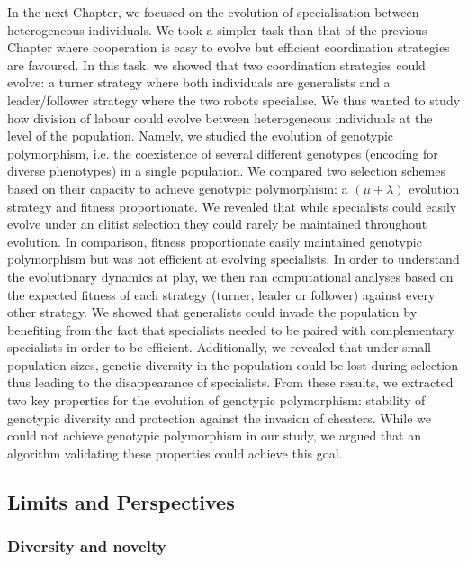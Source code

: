		In the next Chapter, we focused on the evolution of specialisation between heterogeneous individuals. We took a simpler task than that of the previous Chapter where cooperation is easy to evolve but efficient coordination strategies are favoured. In this task, we showed that two coordination strategies could evolve: a turner strategy where both individuals are generalists and a leader/follower strategy where the two robots specialise. We thus wanted to study how division of labour could evolve between heterogeneous individuals at the level of the population. Namely, we studied the evolution of genotypic polymorphism, i.e. the coexistence of several different genotypes (encoding for diverse phenotypes) in a single population. We compared two selection schemes based on their capacity to achieve genotypic polymorphism: a \((\mu + \lambda)\) evolution strategy and fitness proportionate. We revealed that while specialists could easily evolve under an elitist selection they could rarely be maintained throughout evolution. In comparison, fitness proportionate easily maintained genotypic polymorphism but was not efficient at evolving specialists. In order to understand the evolutionary dynamics at play, we then ran computational analyses based on the expected fitness of each strategy (turner, leader or follower) against every other strategy. We showed that generalists could invade the population by benefiting from the fact that specialists needed to be paired with complementary specialists in order to be efficient. Additionally, we revealed that under small population sizes, genetic diversity in the population could be lost during selection thus leading to the disappearance of specialists. From these results, we extracted two key properties for the evolution of genotypic polymorphism: stability of genotypic diversity and protection against the invasion of cheaters. While we could not achieve genotypic polymorphism in our study, we argued that an algorithm validating these properties could achieve this goal.

	\subsection{Limits and Perspectives}

		\subsubsection{Diversity and novelty}

